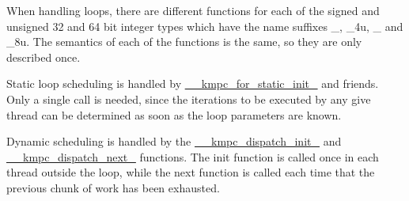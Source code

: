 When handling loops, there are different functions for each of the signed and unsigned 32 and 64 bit integer types which have the name suffixes {\ttfamily \-\_}, {\ttfamily \-\_\-4u}, {\ttfamily \-\_} and {\ttfamily \-\_\-8u}. The semantics of each of the functions is the same, so they are only described once.

Static loop scheduling is handled by \hyperlink{group__WORK__SHARING_gab516cbd738ec072f4929faecbbc456f9}{\-\_\-\-\_\-kmpc\-\_\-for\-\_\-static\-\_\-init\-\_} and friends. Only a single call is needed, since the iterations to be executed by any give thread can be determined as soon as the loop parameters are known.

Dynamic scheduling is handled by the \hyperlink{group__WORK__SHARING_gae991c61cbe8e2942fe1f757a65442b26}{\-\_\-\-\_\-kmpc\-\_\-dispatch\-\_\-init\-\_} and \hyperlink{group__WORK__SHARING_ga5671ff45051907f76cc3d214e1de854b}{\-\_\-\-\_\-kmpc\-\_\-dispatch\-\_\-next\-\_} functions. The init function is called once in each thread outside the loop, while the next function is called each time that the previous chunk of work has been exhausted. 

